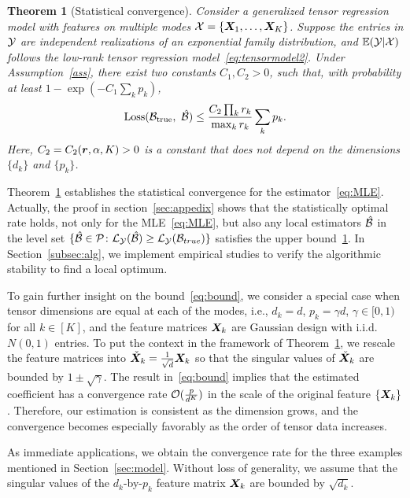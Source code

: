 \documentclass[12pt]{article}
\theoremstyle{plain}
\newtheorem{thm}{Theorem}[section]
\theoremstyle{definition}
\begin{document}
  
\begin{thm}[Statistical convergence]\label{thm:main}
Consider a generalized tensor regression model with features on multiple modes $\mathcal{X}=\{\bm X_1,\ldots,\bm X_K\}$. Suppose the entries in $\mathcal{Y}$ are independent realizations of an exponential family distribution, and $\mathbb{E}(\mathcal{Y}|\mathcal{X})$ follows the low-rank tensor regression model~\eqref{eq:tensormodel2}. Under Assumption~\ref{ass}, there exist two constants $C_1, C_2>0$, such that, with probability at least $1-\exp(-C_1\sum_k p_k)$, 
\begin{equation}\label{eq:bound}
\text{Loss}(\mathcal{B}_{\text{true}},\ \hat {\mathcal{B}}) \leq \frac{ C_{2}\prod_kr_k}{\max_k r_k}\sum_k p_k.
\end{equation}
Here, $C_2=C_2(\bm{r},\alpha, K)>0$ is a constant that does not depend on the dimensions $\{d_k\}$ and $\{p_k\}$. 
\end{thm}

Theorem~\ref{thm:main} establishes the statistical convergence for the estimator~\eqref{eq:MLE}. Actually, the proof in section~\ref{sec:appedix} shows that the statistically optimal rate holds, not only for the MLE~\eqref{eq:MLE},  but also any local estimators $\hat {\mathcal{B}}$ in the level set $\{\hat {\mathcal{B}} \in \mathcal{P} \colon \mathcal{L}_{\mathcal{Y}} (\hat {\mathcal{B}}) \geq \mathcal{L}_{\mathcal{Y}} (\mathcal{B}_{true}) \}$ satisfies the upper bound~\ref{thm:main}. In Section~\ref{subsec:alg}, we implement empirical studies to verify the algorithmic stability to find a local optimum.


To gain further insight on the bound~\eqref{eq:bound}, we consider a special case when tensor dimensions are equal at each of the modes, i.e., $d_k=d$, $p_k=\gamma d$, $\gamma\in [0,1)$ for all $k\in[K]$, and the feature matrices $\bm X_k$ are Gaussian design with i.i.d.\ $N(0,1)$ entries. To put the context in the framework of Theorem~\ref{thm:main}, we rescale the feature matrices into $\check {\bm X}_k={1\over \sqrt{d}}\bm X_k$ so that the singular values of $\check {\bm X}_k$ are bounded by $1\pm \sqrt{\gamma}$. The result in~\eqref{eq:bound} implies that the estimated coefficient has a convergence rate $\mathcal{O}({p\over d^K})$ in the scale of the original feature $\{\bm X_k\}$. Therefore, our estimation is consistent as the dimension grows, and the convergence becomes especially favorably as the order of tensor data increases. 

As immediate applications, we obtain the convergence rate for the three examples mentioned in Section~\ref{sec:model}. Without loss of generality, we assume that the singular values of the $d_k$-by-$p_k$ feature matrix $\bm X_k$ are bounded by $\sqrt{d_k}$. 
\end{document}
